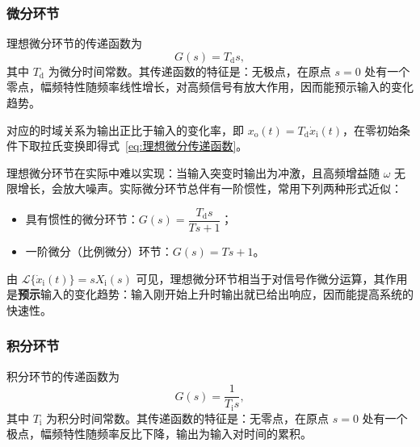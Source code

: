\subsubsection{微分环节}

\begin{definition}[微分环节]
    理想微分环节的传递函数为
    \begin{equation}
        G(s)=T_{\mathrm{d}}s,
        \label{eq:理想微分传递函数}
    \end{equation}
    其中 $T_{\mathrm{d}}$ 为微分时间常数。其传递函数的特征是：无极点，在原点 $s=0$ 处有一个零点，幅频特性随频率线性增长，对高频信号有放大作用，因而能预示输入的变化趋势。
\end{definition}

对应的时域关系为输出正比于输入的变化率，即 $x_{\mathrm{o}}(t)=T_{\mathrm{d}}\dot{x}_{\mathrm{i}}(t)$，在零初始条件下取拉氏变换即得式~\eqref{eq:理想微分传递函数}。

\begin{remark}
    理想微分环节在实际中难以实现：当输入突变时输出为冲激，且高频增益随 $\omega$ 无限增长，会放大噪声。实际微分环节总伴有一阶惯性，常用下列两种形式近似：
    \begin{itemize}
        \item 具有惯性的微分环节：$G(s)=\dfrac{T_{\mathrm{d}}s}{Ts+1}$；
        \item 一阶微分（比例微分）环节：$G(s)=Ts+1$。
    \end{itemize}
\end{remark}

\begin{property}[微分作用的物理意义]
    由 $\mathcal{L}\{\dot{x}_{\mathrm{i}}(t)\}=sX_{\mathrm{i}}(s)$ 可见，理想微分环节相当于对信号作微分运算，其作用是\textbf{预示}输入的变化趋势：输入刚开始上升时输出就已给出响应，因而能提高系统的快速性。
\end{property}

\subsubsection{积分环节}

\begin{definition}[积分环节]
    积分环节的传递函数为
    \begin{equation}
        G(s)=\frac{1}{T_{\mathrm{i}}s},
        \label{eq:积分环节传递函数}
    \end{equation}
    其中 $T_{\mathrm{i}}$ 为积分时间常数。其传递函数的特征是：无零点，在原点 $s=0$ 处有一个极点，幅频特性随频率反比下降，输出为输入对时间的累积。
\end{definition}

